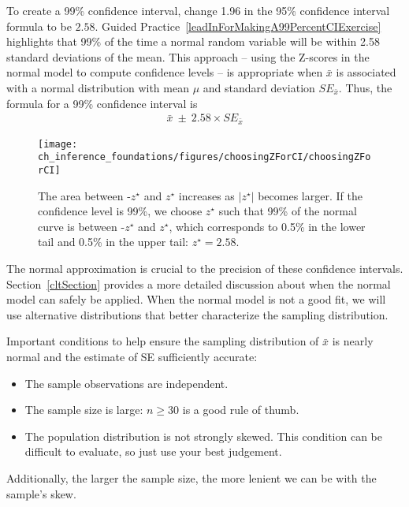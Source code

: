 To create a 99\% confidence interval, change 1.96 in the 95\% confidence interval formula to be $2.58$. Guided Practice~\ref{leadInForMakingA99PercentCIExercise} highlights that 99\% of the time a normal random variable will be within 2.58 standard deviations of the mean. This approach -- using the Z-scores in the normal model to compute confidence levels -- is appropriate when $\bar{x}$ is associated with a normal distribution with mean $\mu$ and standard deviation $SE_{\bar{x}}$. Thus, the formula for a 99\% confidence interval is
\begin{eqnarray}
\bar{x}\ \pm\ 2.58\times SE_{\bar{x}}
\label{99PercCIForMean}
\end{eqnarray}

\begin{figure}[h]
\centering
\texttt{[image: ch\_inference\_foundations/figures/choosingZForCI/choosingZForCI]}
\caption{The area between -$z^{\star}$ and $z^{\star}$ increases as $|z^{\star}|$ becomes larger. If the confidence level is 99\%, we choose $z^{\star}$ such that 99\% of the normal curve is between -$z^{\star}$ and $z^{\star}$, which corresponds to 0.5\% in the lower tail and 0.5\% in the upper tail: $z^{\star}=2.58$.}
\label{choosingZForCI}
\end{figure}

The normal approximation is crucial to the precision of these confidence intervals. Section~\ref{cltSection} provides a more detailed discussion about when the normal model can safely be applied. When the normal model is not a good fit, we will use alternative distributions that better characterize the sampling distribution.

\begin{termBox}{
Important conditions to help ensure the sampling distribution of $\bar{x}$ is nearly normal and the estimate of SE sufficiently accurate:
\begin{itemize}
\setlength{\itemsep}{0mm}
\item The sample observations are independent.
\item The sample size is large: $n\geq30$ is a good rule of thumb.
\item The population distribution is not strongly skewed. This condition can be difficult to evaluate, so just use your best judgement.
\end{itemize}
Additionally, the larger the sample size, the more lenient we can be with the sample's skew.}
\end{termBox}

